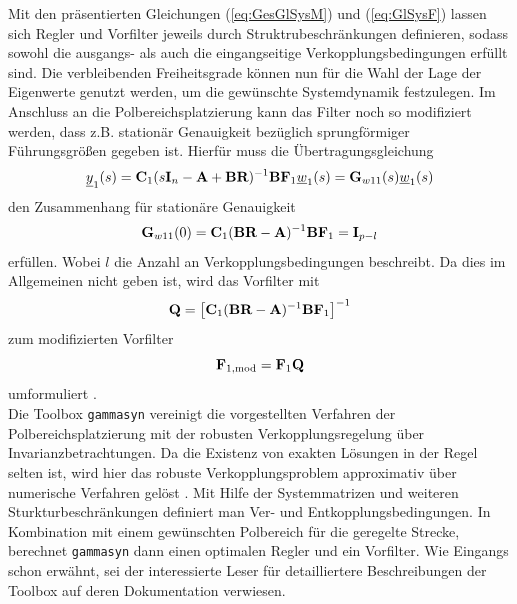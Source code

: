 Mit den präsentierten Gleichungen (\ref{eq:GesGlSysM}) und (\ref{eq:GlSysF}) lassen sich Regler und Vorfilter jeweils durch Struktrubeschränkungen definieren, sodass sowohl die ausgangs- als auch die eingangseitige Ver\-kopp\-lungs\-be\-ding\-ung\-en erfüllt sind. Die verbleibenden Freiheitsgrade können nun für die Wahl der Lage der Eigenwerte genutzt werden, um die gewünschte Systemdynamik festzulegen. Im Anschluss an die Polbereichsplatzierung kann das Filter noch so modifiziert werden, dass z.B. stationär Genauigkeit bezüglich sprungförmiger Führungsgrößen gegeben ist.
Hierfür muss die Übertragungsgleichung 
\begin{equation}
	\underline{y}_{1}(s) = \textbf{C}_1(s\textbf{I}_{n}-\textbf{A}+\textbf{B}\textbf{R})^{-1}\textbf{B}\textbf{F}_{1}\underline{w}_{1}(s) = \textbf{G}_{w11}(s) \underline{w}_{1}(s) 
\end{equation}
den Zusammenhang für stationäre Genauigkeit 
\begin{equation}
	\textbf{G}_{w11}(0) = \textbf{C}_1(\textbf{B}\textbf{R}-\textbf{A})^{-1}\textbf{B}\textbf{F}_{1} = \textbf{I}_{p-l}
\end{equation}
erfüllen. Wobei $l$ die Anzahl an Verkopplungsbedingungen beschreibt.
Da dies im Allgemeinen nicht geben ist, wird das Vorfilter mit
\begin{equation}
	\textbf{Q} = \left[\textbf{C}_1(\textbf{B}\textbf{R}-\textbf{A})^{-1}\textbf{B}\textbf{F}_{1}\right]^{-1}
\end{equation}
zum modifizierten Vorfilter
\begin{equation}\label{eq:f_mod}
	\textbf{F}_{1,\textnormal{mod}} = \textbf{F}_{1}\textbf{Q}
\end{equation}
umformuliert \cite{Mehrgr}.
\\


Die Toolbox \texttt{gammasyn} vereinigt die vorgestellten Verfahren der Polbereichsplatzierung mit der robusten Verkopplungsregelung über Invarianzbetrachtungen. Da die Existenz von exakten Lösungen in der Regel selten ist, wird hier das robuste Verkopplungsproblem approximativ über numerische Verfahren gelöst \cite{Schaub}. 
Mit Hilfe der Systemmatrizen und weiteren Sturkturbeschränkungen definiert man Ver- und Entkopplungsbedingungen. In Kombination mit einem gewünschten Polbereich für die geregelte Strecke, berechnet \texttt{gammasyn} dann einen optimalen Regler und ein Vorfilter. Wie Eingangs schon erwähnt, sei der interessierte Leser für detailliertere Beschreibungen der Toolbox auf deren Dokumentation verwiesen.\\


%
%
%





